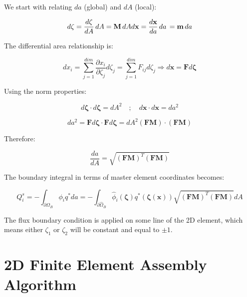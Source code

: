 \documentclass[
  11pt,
  a4paper,
]{scrbook}
\begin{document}
We start with relating \(da\) (global) and \(dA\) (local):

\[d\mathbf{\zeta} = \frac{d\mathbf{\zeta}}{dA} \, dA=\mathbf{M}\, dA \\
d\mathbf{x} = \frac{d\mathbf{x}}{da} \, da \, = \mathbf{m}\, da\]

The differential area relationship is:

\[dx_i = \sum_{j=1}^{dim}\frac{\partial x_i}{\partial \zeta_j} d\zeta_j = \sum_{j=1}^{dim} F_{ij} d\zeta_j\Rightarrow d\mathbf{x}=\mathbf{F}d\mathbf{\zeta}\]

Using the norm properties:

\[d\mathbf{\zeta} \cdot d\mathbf{\zeta}=dA^2 \quad ; \quad d\mathbf{x} \cdot d\mathbf{x}=da^2\]

\[da^2=\mathbf{F}d\mathbf{\zeta} \cdot \mathbf{F}d\mathbf{\zeta} = dA^2(\mathbf{F}\mathbf{M})\cdot(\mathbf{F}\mathbf{M})\]

Therefore:

\[\frac{da}{dA}=\sqrt{(\mathbf{F}\mathbf{M})^T(\mathbf{F}\mathbf{M})}\]

The boundary integral in terms of master element coordinates becomes:

\[Q_i^s = -\int_{\partial\Omega_B}\phi_iq^*da =  -\int_{\partial\hat{\Omega}_B}\hat{\phi}_i(\mathbf{\zeta})q^*(\mathbf{\zeta}(\mathbf{x}))\sqrt{(\mathbf{F}\mathbf{M})^T(\mathbf{F}\mathbf{M})}dA\]

The flux boundary condition is applied on some line of the 2D element,
which means either \(\zeta_1\) or \(\zeta_2\) will be constant and equal
to \(\pm 1\).

\section{2D Finite Element Assembly
Algorithm}\label{d-finite-element-assembly-algorithm}
\end{document}
